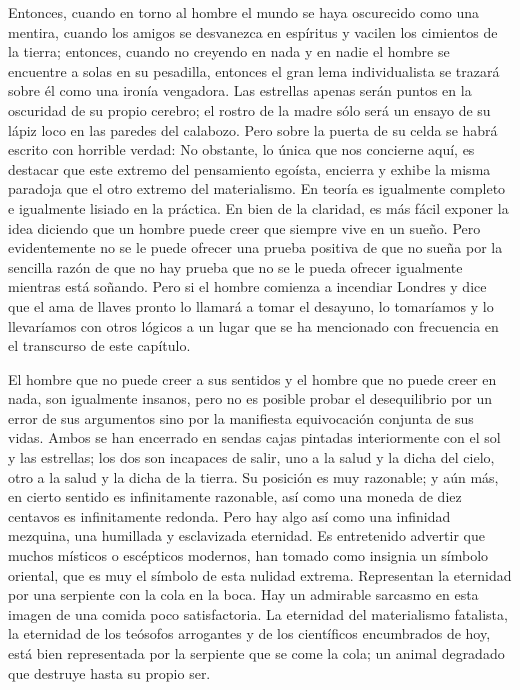 Entonces, cuando en torno al hombre el mundo se haya oscurecido como una mentira, cuando los
amigos se desvanezca en espíritus y vacilen los cimientos de la tierra; entonces, cuando no creyendo en
nada y en nadie el hombre se encuentre a solas en su pesadilla, entonces el gran lema individualista se
trazará sobre él como una ironía vengadora. Las estrellas apenas serán puntos en la oscuridad de su propio
cerebro; el rostro de la madre sólo será un ensayo de su lápiz loco en las paredes del calabozo. Pero sobre
la puerta de su celda se habrá escrito con horrible verdad: 
No obstante, lo única que nos concierne aquí, es destacar que este extremo del pensamiento egoísta,
encierra y exhibe la misma paradoja que el otro extremo del materialismo. En teoría es igualmente
completo e igualmente lisiado en la práctica. En bien de la claridad, es más fácil exponer la idea diciendo
que un hombre puede creer que siempre vive en un sueño. Pero evidentemente no se le puede ofrecer una
prueba positiva de que no sueña por la sencilla razón de que no hay prueba que no se le pueda ofrecer
igualmente mientras está soñando. Pero si el hombre comienza a incendiar Londres y dice que el ama de
llaves pronto lo llamará a tomar el desayuno, lo tomaríamos y lo llevaríamos con otros lógicos a un lugar
que se ha mencionado con frecuencia en el transcurso de este capítulo.

El hombre que no puede creer a sus sentidos y el hombre que no puede creer en nada, son
igualmente insanos, pero no es posible probar el desequilibrio por un error de sus argumentos sino por la
manifiesta equivocación conjunta de sus vidas. Ambos se han encerrado en sendas cajas pintadas
interiormente con el sol y las estrellas; los dos son incapaces de salir, uno a la salud y la dicha del cielo,
otro a la salud y la dicha de la tierra. Su posición es muy razonable; y aún más, en cierto sentido es
infinitamente razonable, así como una moneda de diez centavos es infinitamente redonda. Pero hay algo
así como una infinidad mezquina, una humillada y esclavizada eternidad. Es entretenido advertir que
muchos místicos o escépticos modernos, han tomado como insignia un símbolo oriental, que es muy el
símbolo de esta nulidad extrema. Representan la eternidad por una serpiente con la cola en la boca. Hay
un admirable sarcasmo en esta imagen de una comida poco satisfactoria. La eternidad del materialismo
fatalista, la eternidad de los teósofos arrogantes y de los científicos encumbrados de hoy, está bien
representada por la serpiente que se come la cola; un animal degradado que destruye hasta su propio ser.

